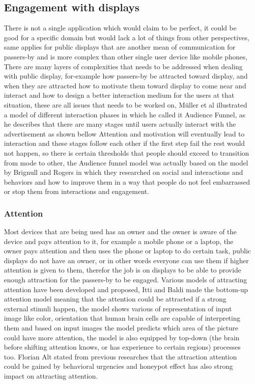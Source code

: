 \subsection{Engagement with displays}
There is not a single application which would claim to be perfect, it could be good for a specific domain but would lack a lot of things from other perspectives, same applies for public displays that are another mean of communication for passers-by and is more complex than other single user device like mobile phones, There are many layers of complexities that needs to be addressed when dealing with public display, for-example how passers-by be attracted toward display, and when they are attracted how to motivate them toward display to come near and interact and how to design a better interaction medium for the users at that situation, these are all issues that needs to be worked on, Müller et al \cite{DesignSpace} illustrated a model of different interaction phases in which he called it Audience Funnel, as he describes that there are many stages until users actually interact with the advertisement as shown bellow Attention and motivation will eventually lead to interaction and these stages follow each other if the first step fail the rest would not happen, so there is certain thresholds that people should exceed to transition from mode to other, the Audience funnel model was actually based on the model by Brignull and Rogers \cite{ EnticingPeople} in which they researched on social and interactions and behaviors and how to improve them in a way that people do not feel embarrassed or stop them from interactions and engagement. 


\subsubsection{Attention}
Most devices that are being used has an owner and the owner is aware of the device and pays attention to it, for example a mobile phone or a laptop, the owner pays attention and then uses the phone or laptop to do certain task, public displays do not have an owner, or in other words everyone can use them if higher attention is given to them, therefor the job is on displays to be able to provide enough attraction for the passers-by to be engaged. 
Various models of attracting attention have been developed and proposed, Itti and Baldi \cite{attention1} made the bottom-up attention model meaning that the attention could be attracted if a strong external stimuli happen, the model shows various of representation of input image like color, orientation that human brain cells are capable of interpreting them and based on input images the model predicts which area of the picture could have more attention, the model is also equipped by top-down (the brain before shifting attention knows, or has experience to certain regions) processes too.  Florian Alt \cite{pervasiv_ad} stated from previous researches that the attraction attention could be gained by behavioral urgencies and honeypot effect has also strong impact on attracting attention.

